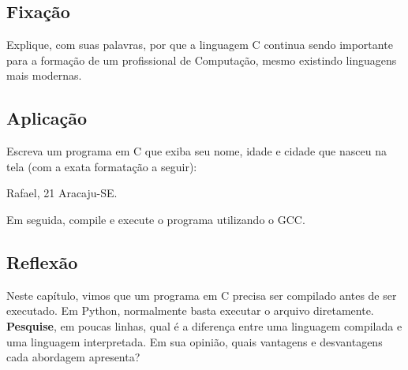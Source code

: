\begin{exercicio}

\subsection*{Fixação} 
Explique, com suas palavras, por que a linguagem C continua sendo importante para a formação de um profissional de Computação, mesmo existindo linguagens mais modernas. \newline

\subsection*{Aplicação} 
Escreva um programa em C que exiba seu nome, idade e cidade que nasceu na tela (com a exata formatação a seguir):

\begin{terminal}
Rafael, 21
Aracaju-SE.
\end{terminal}

Em seguida, compile e execute o programa utilizando o GCC.

\subsection*{Reflexão} 
Neste capítulo, vimos que um programa em C precisa ser compilado antes de ser executado. Em Python, normalmente basta executar o arquivo diretamente.
\textbf{Pesquise}, em poucas linhas, qual é a diferença entre uma linguagem compilada e uma linguagem interpretada. Em sua opinião, quais vantagens e desvantagens cada abordagem apresenta?
    
\end{exercicio}

    

